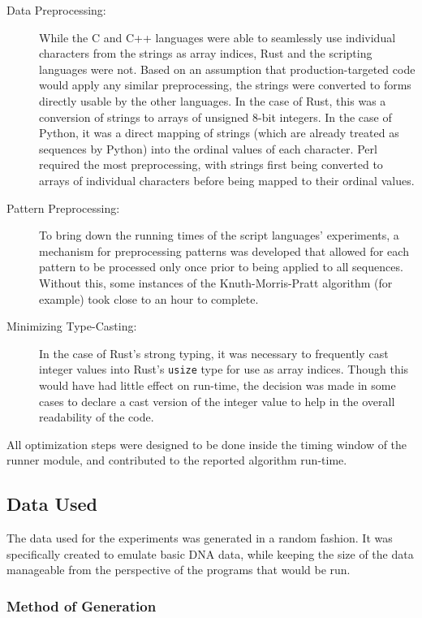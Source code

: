\begin{description}
\item[Data Preprocessing:] While the C and C++ languages were able to seamlessly use individual characters from the strings as array indices, Rust and the scripting languages were not. Based on an assumption that production-targeted code would apply any similar preprocessing, the strings were converted to forms directly usable by the other languages. In the case of Rust, this was a conversion of strings to arrays of unsigned 8-bit integers. In the case of Python, it was a direct mapping of strings (which are already treated as sequences by Python) into the ordinal values of each character. Perl required the most preprocessing, with strings first being converted to arrays of individual characters before being mapped to their ordinal values.
\item[Pattern Preprocessing:] To bring down the running times of the script languages' experiments, a mechanism for preprocessing patterns was developed that allowed for each pattern to be processed only once prior to being applied to all sequences. Without this, some instances of the Knuth-Morris-Pratt algorithm (for example) took close to an hour to complete.
\item[Minimizing Type-Casting:] In the case of Rust's strong typing, it was necessary to frequently cast integer values into Rust's \texttt{usize} type for use as array indices. Though this would have had little effect on run-time, the decision was made in some cases to declare a cast version of the integer value to help in the overall readability of the code.
\end{description}

All optimization steps were designed to be done inside the timing window of the runner module, and contributed to the reported algorithm run-time.

\subsection{Data Used}
\label{subsec:data}

The data used for the experiments was generated in a random fashion. It was specifically created to emulate basic DNA data, while keeping the size of the data manageable from the perspective of the programs that would be run.

\subsubsection{Method of Generation}

